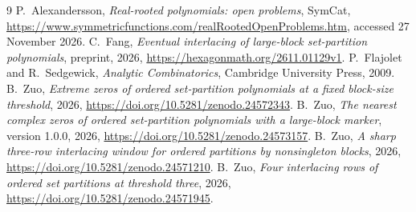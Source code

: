 \documentclass[11pt]{article}
\begin{document}
\begin{thebibliography}{9}
 P.~Alexandersson, \emph{Real-rooted polynomials: open problems}, SymCat, \url{https://www.symmetricfunctions.com/realRootedOpenProblems.htm}, accessed 27 November 2026.
 C.~Fang, \emph{Eventual interlacing of large-block set-partition polynomials}, preprint, 2026, \url{https://hexagonmath.org/2611.01129v1}.
 P.~Flajolet and R.~Sedgewick, \emph{Analytic Combinatorics}, Cambridge University Press, 2009.
 B.~Zuo, \emph{Extreme zeros of ordered set-partition polynomials at a fixed block-size threshold}, 2026, \url{https://doi.org/10.5281/zenodo.24572343}.
 B.~Zuo, \emph{The nearest complex zeros of ordered set-partition polynomials with a large-block marker}, version 1.0.0, 2026, \url{https://doi.org/10.5281/zenodo.24573157}.
 B.~Zuo, \emph{A sharp three-row interlacing window for ordered partitions by nonsingleton blocks}, 2026, \url{https://doi.org/10.5281/zenodo.24571210}.
 B.~Zuo, \emph{Four interlacing rows of ordered set partitions at threshold three}, 2026, \url{https://doi.org/10.5281/zenodo.24571945}.
\end{thebibliography}
\end{document}
